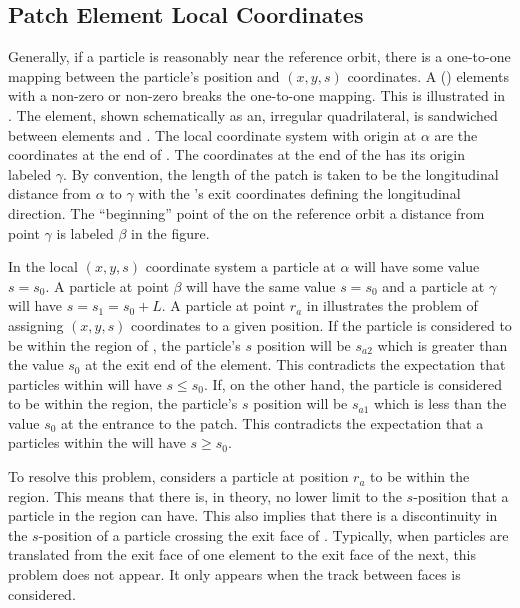\subsection{Patch Element Local Coordinates}
\label{s:patch.prob}

Generally, if a particle is reasonably near the reference orbit, there is a one-to-one mapping
between the particle's position and $(x, y, s)$ coordinates. A  () elements
with a non-zero  or non-zero  breaks the one-to-one mapping. This is
illustrated in .  The  element, shown schematically as an, irregular
quadrilateral, is sandwiched between elements  and . The local coordinate system
with origin at $\alpha$ are the coordinates at the end of . The coordinates at the end of
the  has its origin labeled $\gamma$. By convention, the length of the patch  is
taken to be the longitudinal distance from $\alpha$ to $\gamma$ with the 's exit
coordinates defining the longitudinal direction. The ``beginning'' point of the  on the
reference orbit a distance  from point $\gamma$ is labeled $\beta$ in the figure.

In the local $(x, y, s)$ coordinate system a particle at $\alpha$ will have some value $s = s_0$. A
particle at point $\beta$ will have the same value $s = s_0$ and a particle at $\gamma$ will have $s
= s_1 = s_0 + L$. A particle at point $r_a$ in  illustrates the problem of
assigning $(x, y, s)$ coordinates to a given position. If the particle is considered to be within
the region of , the particle's $s$ position will be $s_{a2}$ which is greater than the
value $s_0$ at the exit end of the element. This contradicts the expectation that particles within
 will have $s \le s_0$.  If, on the other hand, the particle is considered to be within
the  region, the particle's $s$ position will be $s_{a1}$ which is less than the value
$s_0$ at the entrance to the patch. This contradicts the expectation that a particles within the
 will have $s \ge s_0$.

To resolve this problem, \bmad considers a particle at position $r_a$ to be within the 
region. This means that there is, in theory, no lower limit to the $s$-position that a particle in
the  region can have. This also implies that there is a discontinuity in the $s$-position
of a particle crossing the exit face of . Typically, when particles are translated from the
exit face of one element to the exit face of the next, this  problem does not appear. It
only appears when the track between faces is considered.

